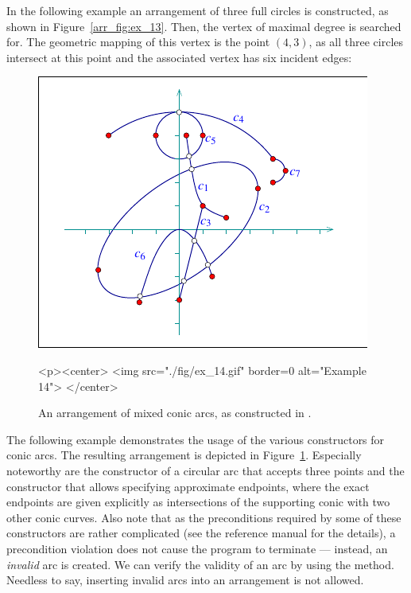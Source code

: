 In the following example an arrangement of three full circles is
constructed, as shown in Figure~\ref{arr_fig:ex_13}. Then, the vertex
of maximal degree is searched for. The geometric mapping of this
vertex is the point $(4,3)$, as all three circles intersect at this point
and the associated vertex has six incident edges:


\begin{figure}[!htp]
\begin{ccTexOnly}
  \begin{center}
  \includegraphics{Arrangement_2/fig/ex_14}
  \end{center}
\end{ccTexOnly}
\begin{ccHtmlOnly}
  <p><center>
  <img src="./fig/ex_14.gif" border=0 alt="Example 14">
  </center>
\end{ccHtmlOnly}
\caption{An arrangement of mixed conic arcs, as constructed in
.}
\label{arr_fig:ex_14}
\end{figure}

The following example demonstrates the usage of the various
constructors for conic arcs. The resulting arrangement is depicted
in Figure~\ref{arr_fig:ex_14}. Especially noteworthy are the
constructor of a circular arc that accepts three points and the
constructor that allows specifying approximate endpoints, where the
exact endpoints are given explicitly as intersections of
the supporting conic with two other conic curves. Also note that as the
preconditions required by some of these constructors are rather
complicated (see the reference manual for the details), a
precondition violation does not cause the program to terminate ---
instead, an {\em invalid} arc is created. We can verify the validity
of an arc by using the  method. Needless to say, inserting
invalid arcs into an arrangement is not allowed.

